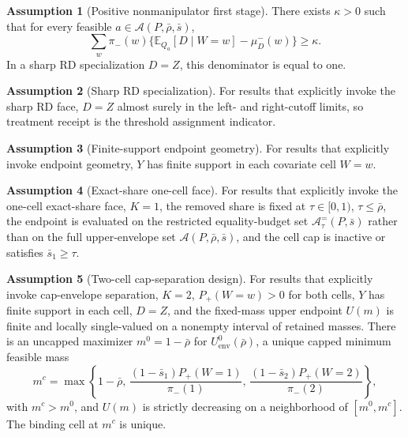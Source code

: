 \documentclass[11pt]{article}
\newcommand{\E}{\mathbb{E}}
\theoremstyle{definition}
\newtheorem{assumption}{Assumption}
\theoremstyle{plain}
\theoremstyle{remark}
\begin{document}
\begin{assumption}[Positive nonmanipulator first stage]\label{ass:positive-first-stage}
There exists \(\kappa>0\) such that for every feasible \(a\in\mathcal A(P,\bar\rho,\bar s)\),
\[
  \sum_w \pi_-(w)\{\E_{Q_a}[D\mid W=w]-\mu^-_D(w)\}\ge \kappa .
\]
In a sharp RD specialization \(D=Z\), this denominator is equal to one.
\end{assumption}

\begin{assumption}[Sharp RD specialization]\label{ass:sharp-rd-specialization}
For results that explicitly invoke the sharp RD face, \(D=Z\) almost surely in the
left- and right-cutoff limits, so treatment receipt is the threshold assignment indicator.
\end{assumption}

\begin{assumption}[Finite-support endpoint geometry]\label{ass:finite-support-geometry}
For results that explicitly invoke endpoint geometry, \(Y\) has finite support in each
covariate cell \(W=w\).
\end{assumption}

\begin{assumption}[Exact-share one-cell face]\label{ass:exact-share-one-cell}
For results that explicitly invoke the one-cell exact-share face, \(K=1\), the removed share
is fixed at \(\tau\in[0,1)\), \(\tau\le\bar\rho\), the endpoint is evaluated on the
restricted equality-budget set \(\mathcal A^{=}_\tau(P,\bar s)\) rather than on the full
upper-envelope set \(\mathcal A(P,\bar\rho,\bar s)\), and the cell cap is inactive or
satisfies \(\bar s_1\ge\tau\).
\end{assumption}

\begin{assumption}[Two-cell cap-separation design]\label{ass:cap-separation}
For results that explicitly invoke cap-envelope separation, \(K=2\), \(P_+(W=w)>0\) for
both cells, \(Y\) has finite support in each cell, \(D=Z\), and the fixed-mass upper endpoint
\(U(m)\) is finite and locally single-valued on a nonempty interval of retained masses.
There is an uncapped maximizer \(m^0=1-\bar\rho\) for \(U^0_{\mathrm{env}}(\bar\rho)\), a unique capped
minimum feasible mass
\[
  m^c=\max\left\{1-\bar\rho,\,
    \frac{(1-\bar s_1)P_+(W=1)}{\pi_-(1)},\,
    \frac{(1-\bar s_2)P_+(W=2)}{\pi_-(2)}
  \right\},
\]
with \(m^c>m^0\), and \(U(m)\) is strictly decreasing on a neighborhood of
\([m^0,m^c]\).  The binding cell at \(m^c\) is unique.
\end{assumption}
\end{document}
